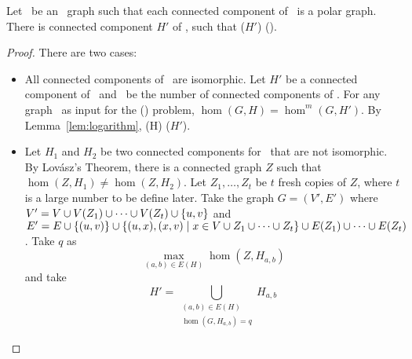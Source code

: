 \begin{lemma} \label{lem:onecomp}
Let \mH\ be an \RBA\ graph such that each connected component of \mH\ is a polar graph.
There is connected component \(H'\) of \mH, such that \chom(\(H'\)) \maple \chom(\mH)\@.
\end{lemma}

\begin{proof}
There are two cases:
\begin{itemize}
\item All connected components of \mH\ are isomorphic.
Let \(H'\) be a connected component of \mH\ and
\mm\ be the number of connected components of \mH\@.
For any graph \mG\ as input for the \chom(\mH) problem, \(\hom(G,H)=\hom^m(G,H')\).
By Lemma~\ref{lem:logarithm}, \chom(H) \mapge \chom(\(H'\))\@.

\item Let \(H_1\) and \(H_2\) be two connected components for \mH\ that are not isomorphic.
By Lov\'{a}sz's Theorem, there is a connected graph \(Z\) such that \(\hom(Z,H_1) \neq \hom(Z,H_2)\)\@.
Let \(Z_1,\dotsc,Z_t\) be \(t\) fresh copies of \(Z\), where \(t\) is a large number to be 
define later.
Take the graph \(G=(V',E')\) where \(V'=V \cup V(Z_1)\cup \dotsb \cup V(Z_t) \cup \{{u,v}\} \)
and \(E'=E \cup \{{(u,v)}\} \cup \{{(u,x),(x,v) \mid x \in V \cup  Z_1 \cup \dotsb \cup Z_t}\} \cup
E(Z_1)\cup \dotsb \cup E(Z_t)\)\@. Take \(q\) as \[\max \limits_{(a,b) \in E(H)} \hom(Z,H_{a,b})\] and
take \[H'=\bigcup_{\substack{(a,b)\in E(H) \\ 
\hom(G,H_{a,b})=q}} H_{a,b}\]


\end{itemize}
\end{proof}

